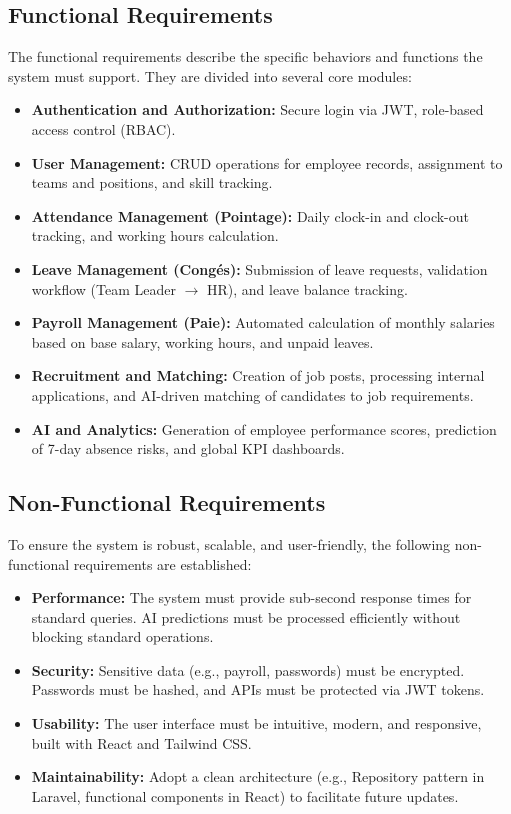 \subsection{Functional Requirements}
The functional requirements describe the specific behaviors and functions the system must support. They are divided into several core modules:
\begin{itemize}
    \item \textbf{Authentication and Authorization:} Secure login via JWT, role-based access control (RBAC).
    \item \textbf{User Management:} CRUD operations for employee records, assignment to teams and positions, and skill tracking.
    \item \textbf{Attendance Management (Pointage):} Daily clock-in and clock-out tracking, and working hours calculation.
    \item \textbf{Leave Management (Congés):} Submission of leave requests, validation workflow (Team Leader $\rightarrow$ HR), and leave balance tracking.
    \item \textbf{Payroll Management (Paie):} Automated calculation of monthly salaries based on base salary, working hours, and unpaid leaves.
    \item \textbf{Recruitment and Matching:} Creation of job posts, processing internal applications, and AI-driven matching of candidates to job requirements.
    \item \textbf{AI and Analytics:} Generation of employee performance scores, prediction of 7-day absence risks, and global KPI dashboards.
\end{itemize}

\subsection{Non-Functional Requirements}
To ensure the system is robust, scalable, and user-friendly, the following non-functional requirements are established:
\begin{itemize}
    \item \textbf{Performance:} The system must provide sub-second response times for standard queries. AI predictions must be processed efficiently without blocking standard operations.
    \item \textbf{Security:} Sensitive data (e.g., payroll, passwords) must be encrypted. Passwords must be hashed, and APIs must be protected via JWT tokens.
    \item \textbf{Usability:} The user interface must be intuitive, modern, and responsive, built with React and Tailwind CSS.
    \item \textbf{Maintainability:} Adopt a clean architecture (e.g., Repository pattern in Laravel, functional components in React) to facilitate future updates.
\end{itemize}

